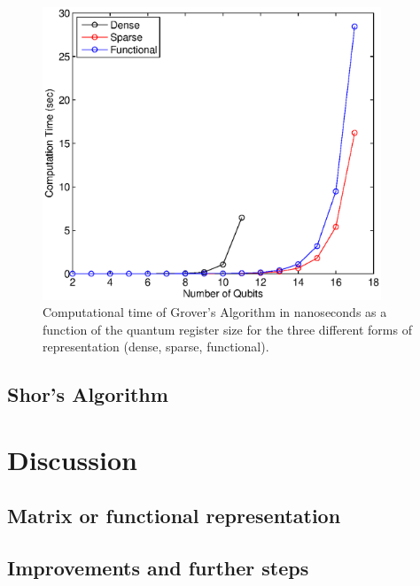 \documentclass[bibliography=totocnumbered]{article}
\theoremstyle{NoticeStyle}
\begin{document}
\begin{figure}[H]
	\centering
	\includegraphics[width=0.9\textwidth]{img/Grover_Time_Performance.eps}
	\caption{Computational time of Grover's Algorithm in nanoseconds as a function of the quantum register size for the three different forms of representation (dense, sparse, functional).}
	\label{grover_time_performance}
\end{figure}




\subsection{Shor's Algorithm}\label{sec:Shor}


%
\section{Discussion}\label{sec:Discussion}

\subsection{Matrix or functional representation}

\subsection{Improvements and further steps}
\end{document}
